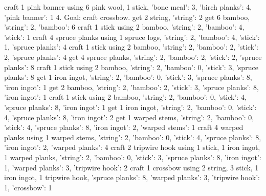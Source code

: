 \begin{UserTurn}
craft 1 pink banner using 6 pink wool, 1 stick, {'bone meal': 3, 'birch planks': 4, 'pink banner': 1}
4.
Goal: craft crossbow.
get 2 string, {'string': 2}
get 6 bamboo, {'string': 2, 'bamboo': 6}
craft 1 stick using 2 bamboo, {'string': 2, 'bamboo': 4, 'stick': 1}
craft 4 spruce planks using 1 spruce logs, {'string': 2, 'bamboo': 4, 'stick': 1, 'spruce planks': 4}
craft 1 stick using 2 bamboo, {'string': 2, 'bamboo': 2, 'stick': 2, 'spruce planks': 4}
get 4 spruce planks, {'string': 2, 'bamboo': 2, 'stick': 2, 'spruce planks': 8}
craft 1 stick using 2 bamboo, {'string': 2, 'bamboo': 0, 'stick': 3, 'spruce planks': 8}
get 1 iron ingot, {'string': 2, 'bamboo': 0, 'stick': 3, 'spruce planks': 8, 'iron ingot': 1}
get 2 bamboo, {'string': 2, 'bamboo': 2, 'stick': 3, 'spruce planks': 8, 'iron ingot': 1}
craft 1 stick using 2 bamboo, {'string': 2, 'bamboo': 0, 'stick': 4, 'spruce planks': 8, 'iron ingot': 1}
get 1 iron ingot, {'string': 2, 'bamboo': 0, 'stick': 4, 'spruce planks': 8, 'iron ingot': 2}
get 1 warped stems, {'string': 2, 'bamboo': 0, 'stick': 4, 'spruce planks': 8, 'iron ingot': 2, 'warped stems': 1}
craft 4 warped planks using 1 warped stems, {'string': 2, 'bamboo': 0, 'stick': 4, 'spruce planks': 8, 'iron ingot': 2, 'warped planks': 4}
craft 2 tripwire hook using 1 stick, 1 iron ingot, 1 warped planks, {'string': 2, 'bamboo': 0, 'stick': 3, 'spruce planks': 8, 'iron ingot': 1, 'warped planks': 3, 'tripwire hook': 2}
craft 1 crossbow using 2 string, 3 stick, 1 iron ingot, 1 tripwire hook, {'spruce planks': 8, 'warped planks': 3, 'tripwire hook': 1, 'crossbow': 1}
\end{UserTurn}

